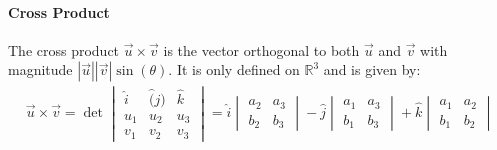 \paragraph*{Cross Product}
The cross product $\vec{u} \times \vec{v}$ is the vector orthogonal to both $\vec{u}$ and $\vec{v}$ with magnitude $|\vec{u}||\vec{v}|\sin(\theta)$. 
It is only defined on $\mathbb{R}^3$ and is given by:
\begin{align*}
\vec{u} \times \vec{v} = \det \begin{vmatrix}
    \hat{i} & \hat(j) & \hat{k} \\
    u_1 & u_2 & u_3 \\
    v_1 & v_2 & v_3
\end{vmatrix} = \hat{i} \begin{vmatrix}
    a_2 & a_3 \\
    b_2 & b_3
\end{vmatrix} - \hat{j} \begin{vmatrix}
    a_1 & a_3 \\
    b_1 & b_3
\end{vmatrix} + \hat{k} \begin{vmatrix}
    a_1 & a_2 \\
    b_1 & b_2
\end{vmatrix}
\end{align*}

